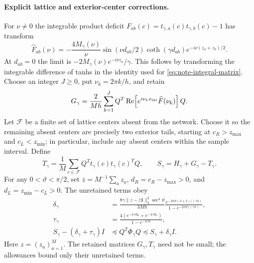 \paragraph{Explicit lattice and exterior-center corrections.}
For $\nu\ne0$ the integrable product deficit
$F_{ab}(c)=t_{\gamma,a}(c)t_{\gamma,b}(c)-1$ has transform
\begin{equation}
 \widehat F_{ab}(\nu)
 =-\frac{4M_\gamma(\nu)}{\nu}
 \sin(\nu d_{ab}/2)\coth(\gamma d_{ab})
 e^{-i\nu(z_a+z_b)/2}.
 \label{eq:note-deficit-transform}
\end{equation}
At $d_{ab}=0$ the limit is $-2M_\gamma(\nu)e^{-i\nu z_a}/\gamma$.
This follows by transforming the integrable difference of tanhs in the
identity used for \eqref{eq:note-integral-matrix}.
Choose an integer $J\ge0$, put $\nu_k=2\pi k/h$, and retain
\begin{equation}
 G_\gamma=\frac2{Mh}\sum_{k=1}^J
 Q^T\operatorname{Re}\!\left[e^{i\nu_k x_{\rm lat}}
 \widehat F(\nu_k)\right]Q.
 \label{eq:note-lattice-correction}
\end{equation}
Let $\mathcal F$ be a finite set of lattice centers absent from the network.
Choose it so the remaining absent centers are precisely two exterior tails,
starting at $c_R>z_{\max}$ and $c_L<z_{\min}$; in particular, include any
absent centers within the sample interval. Define
\begin{equation}
 T_\gamma=\frac1M\sum_{c\in\mathcal F}Q^Tt_\gamma(c)t_\gamma(c)^TQ,
 \qquad S_\gamma=H_\gamma+G_\gamma-T_\gamma.
 \label{eq:note-corrected-matrix}
\end{equation}
For any $0<\vartheta<\pi/2$, set $\bar z=M^{-1}\sum_a z_a$,
$d_R=c_R-z_{\max}>0$, and $d_L=z_{\min}-c_L>0$. The unretained terms obey
\begin{align}
 \delta_\gamma&=
 \frac{8\gamma\|z-\bar z\mathbf1\|_2^2\sec^4\vartheta}{3Mh}
 \frac{e^{-2\pi\vartheta(J+1)/(\gamma h)}}
 {1-e^{-2\pi\vartheta/(\gamma h)}},\label{eq:note-grid-allowance}\\
 \tau_\gamma&=
 \frac{4(e^{-4\gamma d_R}+e^{-4\gamma d_L})}{1-e^{-4\gamma h}},
 \label{eq:note-tail-allowance}\\
 S_\gamma-(\delta_\gamma+\tau_\gamma)I
 &\preceq Q^T\Phi_\gamma Q\preceq S_\gamma+\delta_\gamma I.
 \label{eq:note-matrix-enclosure}
\end{align}
Here $z=(z_a)_{a=1}^M$. The retained matrices $G_\gamma,T_\gamma$
need not be small; the allowances bound only their unretained terms.

